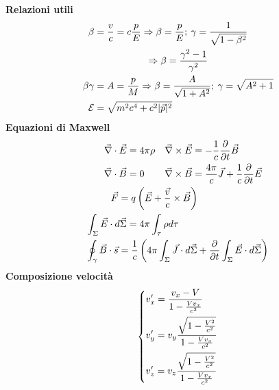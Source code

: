 \documentclass{article}
\begin{document}
\begin{minipage}[t]{.25\textwidth}
{\Large \textbf{Relazioni utili}}
\begin{align*}
    \beta &= \frac{v}{c} = c\frac{p}{E} \Rightarrow \beta = \frac{p}{E};\> \gamma = \frac{1}{\sqrt{1-\beta^2}}\\
    \Rightarrow \beta \span= \frac{\gamma^2-1}{\gamma^2}\\
    \beta\gamma &= A = \frac{p}{M} \Rightarrow \beta = \frac{A}{\sqrt{1+A^2}}; \> \gamma = \sqrt{A^2+1}\\
    \mathcal{E} &= \sqrt{m^2c^4+c^2|\vec{p}|^2}
\end{align*}
\vspace{10pt}
{\Large \textbf{Equazioni di Maxwell}}
\begin{align*}
    \vec{\nabla}\cdot \vec{E} &= 4\pi\rho  &\vec{\nabla}\times\vec{E} &= -\frac{1}{c}\frac{\partial}{\partial t}\vec{B}\\
    \vec{\nabla}\cdot\vec{B} &= 0  &\vec{\nabla}\times\vec{B} &= \frac{4\pi}{c}\vec{J}+\frac{1}{c}\frac{\partial}{\partial t}\vec{E}\\
    \vec{F} =  q\left (\vec{E}+\frac{\vec{v}}{c}\times\vec{B}\right )\span\span\span \\
    \int_\Sigma \vec{E}\cdot d\vec{\Sigma} &= 4\pi\int_\tau \rho d\tau \span\span\span\\
    \oint_\gamma \vec{B}\cdot \vec{s} = \frac{1}{c}\left (4\pi \int_\Sigma \vec{J}\cdot d\vec{\Sigma} + \frac{\partial}{\partial t}\int_\Sigma \vec{E}\cdot d\vec{\Sigma} \right )\span\span\span
\end{align*}
\vspace{10pt}
{\Large \textbf{Composizione velocità}}
\[
\begin{dcases}
v_x' = \frac{v_x-V}{1-\frac{V v_x}{c^2}}\\
v_y' = v_y \frac{\sqrt{1-\frac{V^2}{c^2}}}{1-\frac{V v_x}{c^2}}\\
v_z' = v_z \frac{\sqrt{1-\frac{V^2}{c^2}}}{1-\frac{V v_x}{c^2}}
\end{dcases}
\]
\raggedright
\end{minipage}%
\end{document}
